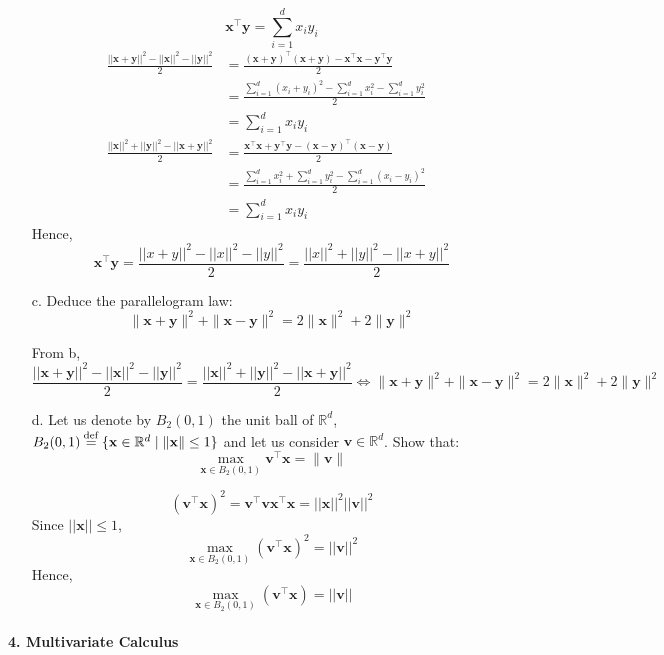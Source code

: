 \documentclass[11pt]{article}
\newcommand{\R}{\mathbb{R}}                     %
\newcommand{\bx}{\mathbf{x}}
\newcommand{\by}{\mathbf{y}}
\newcommand{\bv}{\mathbf{v}}
\newcommand{\eqdef}{\mathbin{\stackrel{\rm def}{=}}}
\begin{document}
\begin{itemize}
\color{blue}
$$\bx^\intercal\by=\sum_{i=1}^d x_iy_i$$
\begin{align*}
\frac{||\bx+\by||^2-||\bx||^2-||\by||^2}{2} &= \frac{(\bx+\by)^\intercal (\bx+\by)-\bx^\intercal \bx-\by^\intercal \by}{2} &\\
&= \frac{\sum_{i=1}^d(x_i+y_i)^2-\sum_{i=1}^dx_i^2-\sum_{i=1}^dy_i^2}{2} &\\
&= \sum_{i=1}^d x_iy_i
\end{align*}
\begin{align*}
\frac{||\bx||^2+||\by||^2-||\bx+\by||^2}{2} &= \frac{\bx^\intercal \bx+\by^\intercal \by-(\bx-\by)^\intercal (\bx-\by)}{2} &\\
&= \frac{\sum_{i=1}^dx_i^2+\sum_{i=1}^dy_i^2-\sum_{i=1}^d(x_i-y_i)^2}{2} &\\
&= \sum_{i=1}^d x_iy_i
\end{align*}
Hence, $$\bx^\intercal \by=\frac{||x+y||^2-||x||^2-||y||^2}{2}=\frac{||x||^2+||y||^2-||x+y||^2}{2}$$
\color{black}
        
    \item[c.] Deduce the parallelogram law:
        \begin{displaymath}
                \|\bx+\by\|^2 + \|\bx-\by\|^2 = 2\|\bx\|^2 + 2\|\by\|^2
        \end{displaymath}
 
\color{blue}
From b, 
$$\frac{||\bx+\by||^2-||\bx||^2-||\by||^2}{2}=\frac{||\bx||^2+||\by||^2-||\bx+\by||^2}{2} \Leftrightarrow \|\bx+\by\|^2 + \|\bx-\by\|^2 = 2\|\bx\|^2 + 2\|\by\|^2$$
\color{black}

    \item[d.] Let us denote by $B_2(0, 1)$ the unit ball of $\R^d$, $B_2(0,1)\eqdef
        \{\bx\in\R^d\;|\;\|\bx\|\leq 1\}$ and let us consider $\bv\in\R^d$. Show that:
        \begin{displaymath}
            \max_{\bx\in B_2(0,1)}\bv^\intercal \bx = \|\bv\|
        \end{displaymath}

\color{blue}
$$(\bv^\intercal \bx)^2 = \bv^\intercal \bv \bx^\intercal \bx = ||\bx||^2||\bv||^2 $$
Since $||\bx|| \leq 1$, $$\max_{\bx\in B_2(0,1)} (\bv^\intercal \bx)^2 = ||\bv||^2$$
Hence, $$\max_{\bx\in B_2(0,1)} (\bv^\intercal \bx) = ||\bv||$$
\color{black}

\end{itemize}

\paragraph{4. Multivariate Calculus}
\end{document}
